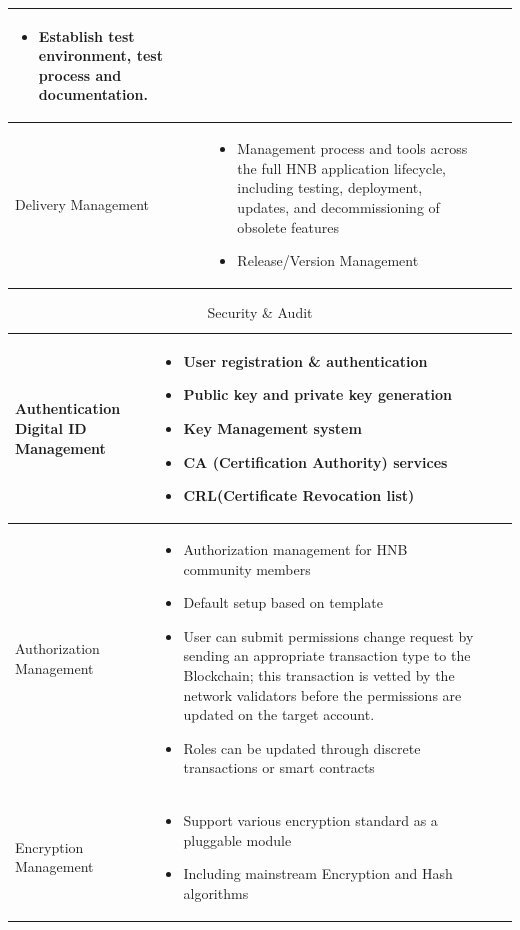 \documentclass[fleqn,10pt]{SelfArx} %
\begin{document}
\begin{table}[!hbt]
\begin{tabular}{lp{10cm}p{50cm}r}
\begin{itemize}
\item{Establish test environment, test process and documentation. }
\end{itemize}\\
\midrule
Delivery Management
 & 
\begin{itemize}
\item{Management process and tools across the full HNB application lifecycle, including testing, deployment, updates, and decommissioning of obsolete features }
\item{Release/Version Management }
\end{itemize}\\
\bottomrule
\end{tabular}
\label{tab:label}
\end{table}


\begin{table}[!ht]
\caption{Security \& Audit}
\centering
\begin{tabular}{lp{12cm}p{50cm}r}
\toprule
Authentication Digital
ID
Management
 & 
\begin{itemize}
\item{User registration \& authentication}
\item{Public key and private key generation}
\item{Key Management system}
\item{CA (Certification Authority) services}
\item{CRL(Certificate Revocation list)}
\end{itemize}\\
\midrule
Authorization Management
 & 
\begin{itemize}
\item{Authorization management for HNB community members}
\item{Default setup based on template}
\item{User can submit permissions change request by sending an appropriate transaction type to the Blockchain; this transaction is vetted by the network validators before the permissions are updated on the target account. }
\item{Roles can be updated through discrete transactions or smart contracts}
\end{itemize}\\
\midrule
Encryption Management
 & 
\begin{itemize}
\item{Support various encryption standard as a pluggable module}
\item{Including mainstream Encryption and Hash algorithms}

\end{itemize}
\end{tabular}
\end{table}
\end{document}
